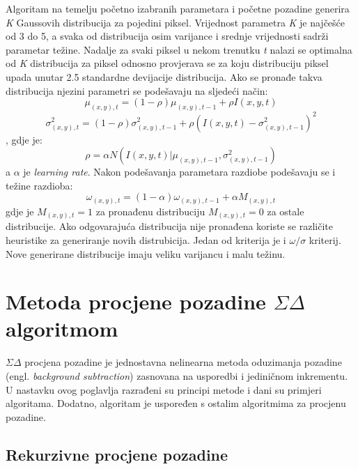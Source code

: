 \documentclass[a4paper,twocolumn]{article}
\begin{document}
Algoritam na temelju početno izabranih parametara i početne pozadine generira
\textit{K} Gaussovih distribucija za pojedini piksel. Vrijednost parametra
\textit{K} je najčešće od 3 do 5, a svaka od distribucija osim varijance i
srednje vrijednosti sadrži parametar težine. Nadalje za svaki piksel u nekom
trenutku \textit{t} nalazi se optimalna od \textit{K} distribucija za piksel
odnosno provjerava se za koju distribuciju piksel upada unutar 2.5 standardne
devijacije distribucija. Ako se pronađe takva distribucija njezini parametri
se podešavaju na sljedeći način:
\begin{equation*}
\mu_{(x,y), t} = (1 - \rho)\mu_{(x,y), t - 1} + \rho I(x,y,t)
\end{equation*}
\begin{equation*}
\sigma^{2}_{(x,y), t} = (1 - \rho)\sigma^{2}_{(x,y), t-1} + \rho(I(x,y,t) -
\sigma^{2}_{(x,y), t-1})^2
\end{equation*}, gdje je:
\begin{equation*}
\rho = \alpha N(I(x,y,t)|\mu_{(x,y), t-1},\sigma^{2}_{(x,y), t-1})
\end{equation*}
a \(\alpha \) je \textit{learning rate}. Nakon podešavanja parametara razdiobe
podešavaju se i težine razdioba:
\begin{equation*}
\omega_{(x,y), t} = (1 - \alpha)\omega_{(x,y), t-1} + \alpha M_{(x,y), t}
\end{equation*}
gdje je \(M_{(x,y), t} = 1\) za pronađenu distribuciju \(M_{(x,y), t} = 0\) za
ostale distribucije. Ako odgovarajuća distribucija nije pronađena koriste se
različite heuristike za generiranje novih distrubicija. Jedan od kriterija je
i \(\omega/\sigma\) kriterij. Nove generirane distribucije imaju veliku
varijancu i malu težinu.

\section{Metoda procjene pozadine \(\Sigma\Delta\) algoritmom}

\(\Sigma\Delta\) procjena pozadine je jednostavna nelinearna metoda oduzimanja
pozadine (engl. \textit{background subtraction}) zasnovana na usporedbi i
jediničnom inkrementu. U nastavku ovog poglavlja razrađeni su principi metode
i dani su primjeri algoritama. Dodatno, algoritam je uspoređen s ostalim
algoritmima za procjenu pozadine.

\subsection{Rekurzivne procjene pozadine}
\end{document}
